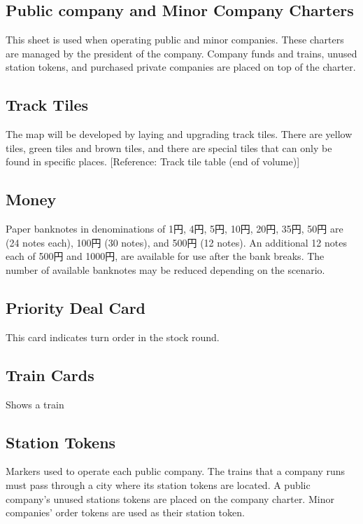 \documentclass{article}
\begin{document}
\begin{CJK}{UTF8}{min}
\begin{multicols}{2}
\subsection{Public company and Minor Company Charters}
This sheet is used when operating public and minor companies.  These
charters are managed by the president of the company. Company funds
and trains, unused station tokens, and purchased private companies are
placed on top of the charter.


\subsection{Track Tiles}

The map will be developed by laying and upgrading track tiles. There
are yellow tiles, green tiles and brown tiles, and there are special
tiles that can only be found in specific places. [Reference: Track tile
table (end of volume)]


\subsection{Money}

Paper banknotes in denominations of 1円, 4円, 5円, 10円, 20円, 35円,
50円 are (24 notes each), 100円 (30 notes), and 500円 (12 notes). An
additional 12 notes each of 500円 and 1000円, are available for use
after the bank breaks. The number of available banknotes may be
reduced depending on the scenario.

\subsection{Priority Deal Card}

This card indicates turn order in the stock round.


\subsection{Train Cards}
Shows a train

\subsection{Station Tokens}
Markers used to operate each public company. The trains that a company
runs must pass through a city where its station tokens are located. A
public company's unused stations tokens are placed on the company
charter. Minor companies' order tokens are used as their station
token.



\end{multicols}
\end{CJK}
\end{document}
